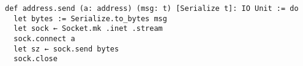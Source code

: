 \begin{lstlisting}[language=lean]
def address.send (a: address) (msg: t) [Serialize t]: IO Unit := do
  let bytes := Serialize.to_bytes msg
  let sock ← Socket.mk .inet .stream
  sock.connect a
  let sz ← sock.send bytes
  sock.close
\end{lstlisting}

